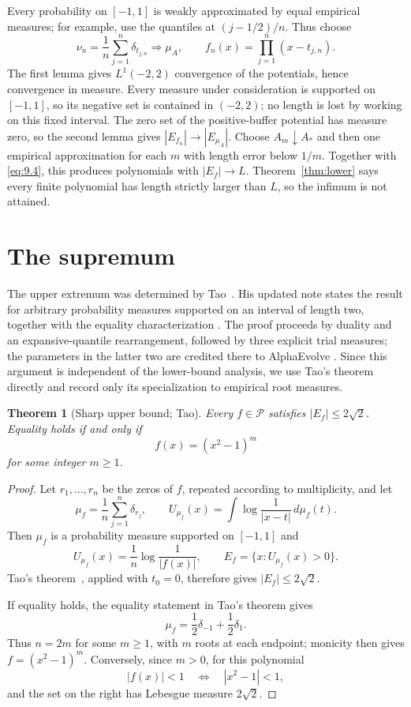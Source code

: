 \documentclass[11pt]{article}
\numberwithin{equation}{section}
\theoremstyle{plain}
\newtheorem{theorem}{Theorem}[section]
\theoremstyle{definition}
\theoremstyle{remark}
\newcommand{\1}{\mathbf 1}
\newcommand{\dd}{\,d}
\begin{document}
Every probability on $[-1,1]$ is weakly approximated by equal empirical
measures; for example, use the quantiles at $(j-1/2)/n$.  Thus choose
\[
 \nu_n=\frac1n\sum_{j=1}^n\delta_{t_{j,n}}\Rightarrow\mu_A,
 \qquad f_n(x)=\prod_{j=1}^n(x-t_{j,n}).
\]
The first lemma gives $L^1(-2,2)$ convergence of the potentials, hence
convergence in measure.  Every measure under consideration is supported on
$[-1,1]$, so its negative set is contained in $(-2,2)$; no length is lost
by working on this fixed interval.  The zero set of the positive-buffer
potential has measure zero, so the second lemma gives
$|E_{f_n}|\to|E_{\mu_A}|$.  Choose $A_m\downarrow A_*$ and then one
empirical approximation for each $m$ with length error below $1/m$.
Together with \eqref{eq:9.4}, this produces polynomials with $|E_f|\to L$.
Theorem~\ref{thm:lower} says every finite polynomial has length strictly
larger than $L$, so the infimum is not attained.

\section{The supremum}\label{sec:supremum}

The upper extremum was determined by Tao~\cite{Tao1038}.  His updated note
states the result for arbitrary probability measures supported on an
interval of length two, together with the equality characterization
\cite[Theorem~2.1]{Tao1038Updated}.  The proof proceeds by duality and an
expansive-quantile rearrangement, followed by three explicit trial measures;
the parameters in the latter two are credited there to AlphaEvolve
\cite[p.~5]{Tao1038Updated}.  Since this argument is independent of the
lower-bound analysis, we use Tao's theorem directly and record only its
specialization to empirical root measures.

\begin{theorem}[Sharp upper bound; Tao]\label{thm:upper}
Every $f\in\mathcal P$ satisfies $|E_f|\le2\sqrt2$.  Equality holds if and
only if
\[
 f(x)=(x^2-1)^m
\]
for some integer $m\ge1$.
\end{theorem}

\begin{proof}
Let $r_1,\ldots,r_n$ be the zeros of $f$, repeated according to
multiplicity, and let
\[
 \mu_f=\frac1n\sum_{j=1}^n\delta_{r_j},\qquad
 U_{\mu_f}(x)=\int\log\frac1{|x-t|}\dd\mu_f(t).
\]
Then $\mu_f$ is a probability measure supported on $[-1,1]$ and
\[
 U_{\mu_f}(x)=\frac1n\log\frac1{|f(x)|},\qquad
 E_f=\{x:U_{\mu_f}(x)>0\}.
\]
Tao's theorem~\cite[Theorem~2.1]{Tao1038Updated}, applied with $t_0=0$,
therefore gives $|E_f|\le2\sqrt2$.

If equality holds, the equality statement in Tao's theorem gives
\[
 \mu_f=\frac12\delta_{-1}+\frac12\delta_1.
\]
Thus $n=2m$ for some $m\ge1$, with $m$ roots at each endpoint; monicity
then gives $f=(x^2-1)^m$.  Conversely, since $m>0$, for this polynomial
\[
 |f(x)|<1\quad\Longleftrightarrow\quad |x^2-1|<1,
\]
and the set on the right has Lebesgue measure $2\sqrt2$.
\end{proof}
\end{document}
